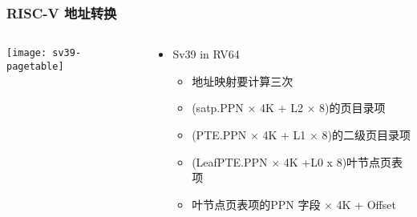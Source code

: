 \begin{frame} 
	\frametitle{RISC-V 地址转换}
	
	\begin{columns}
		
		\begin{column}{.4\textwidth}
			
			\texttt{[image: sv39-pagetable]}
			
		\end{column}
		
		
		\begin{column}{.6\textwidth}
			
			\begin{itemize}
				\item Sv39 in RV64 
				\begin{itemize}\small
				 	\item 地址映射要计算三次
					\item (satp.PPN × 4K + L2 × 8)的页目录项
					\item (PTE.PPN × 4K + L1 × 8)的二级页目录项
					\item (LeafPTE.PPN × 4K +L0 x 8)叶节点页表项
					\item 叶节点页表项的PPN 字段 × 4K + Offset
					
				\end{itemize}
			\end{itemize}
			
			
			
		\end{column}
		
		
	\end{columns}
\end{frame}



